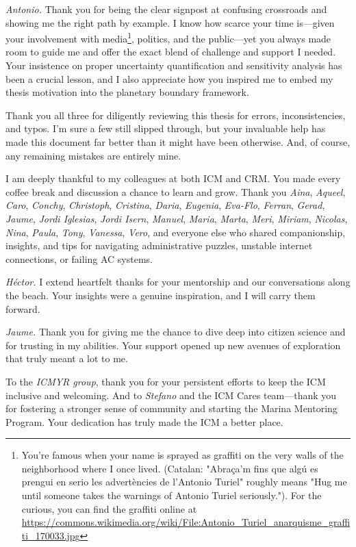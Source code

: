 \begin{acknowledgements}
\emph{Antonio.} Thank you for being the clear signpost at confusing crossroads and showing me the right path by example. I know how scarce your time is---given your involvement with media\footnote{You're famous when your name is sprayed as graffiti on the very walls of the neighborhood where I once lived. (Catalan: "Abraça'm fins que algú es prengui en serio les advertències de l'Antonio Turiel" roughly means "Hug me until someone takes the warnings of Antonio Turiel seriously."). For the curious, you can find the graffiti online at \url{https://commons.wikimedia.org/wiki/File:Antonio_Turiel_anarquisme_graffiti_170033.jpg}}, politics, and the public---yet you always made room to guide me and offer the exact blend of challenge and support I needed. Your insistence on proper uncertainty quantification and sensitivity analysis has been a crucial lesson, and I also appreciate how you inspired me to embed my thesis motivation into the planetary boundary framework.

Thank you all three for diligently reviewing this thesis for errors, inconsistencies, and typos. I'm sure a few still slipped through, but your invaluable help has made this document far better than it might have been otherwise. And, of course, any remaining mistakes are entirely mine.

I am deeply thankful to  my colleagues at both ICM and CRM. You made every coffee break and discussion a chance to learn and grow. Thank you \emph{Aina}, \emph{Aqueel}, \emph{Caro}, \emph{Conchy}, \emph{Christoph}, \emph{Cristina}, \emph{Daria}, \emph{Eugenia}, \emph{Eva-Flo}, \emph{Ferran}, \emph{Gerad}, \emph{Jaume}, \emph{Jordi Iglesias}, \emph{Jordi Isern}, \emph{Manuel}, \emph{Maria}, \emph{Marta}, \emph{Meri}, \emph{Miriam}, \emph{Nicolas}, \emph{Nina}, \emph{Paula}, \emph{Tony}, \emph{Vanessa}, \emph{Vero}, and everyone else who shared companionship, insights, and tips for navigating administrative puzzles, unstable internet connections, or failing AC systems.

\emph{Héctor.} I extend heartfelt thanks for your mentorship and our conversations along the beach. Your insights were a genuine inspiration, and I will carry them forward.

\emph{Jaume.} Thank you for giving me the chance to dive deep into citizen science and for trusting in my abilities. Your support opened up new avenues of exploration that truly meant a lot to me.

To the \emph{ICMYR group}, thank you for your persistent efforts to keep the ICM inclusive and welcoming. And to \emph{Stefano} and the ICM Cares team---thank you for fostering a stronger sense of community and starting the Marina Mentoring Program. Your dedication has truly made the ICM a better place.


\end{acknowledgements}

